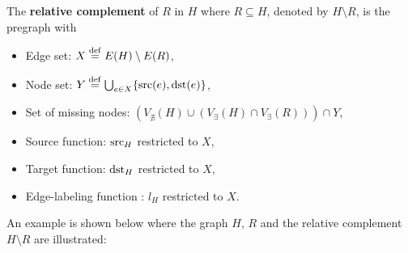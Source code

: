 The \textbf{relative complement} of $R$ in $H$ where $R \subseteq H$, denoted by $H \setminus R$, is the pregraph with
\begin{itemize}
    \item Edge set: $X \overset{\operatorname{def}}{=} E(H) \setminus E(R)$,
    \item Node set: $Y \overset{\operatorname{def}}{=} \bigcup_{e \in X} \{\operatorname{src}(e), \operatorname{dst}(e)\}$,
    \item Set of missing nodes: $
   ( V_{\nexists}(H)  \cup
        (
                  V_\exists(H) 
                  \cap 
                  V_\exists(R)
                  )
   )
        \cap  
        Y
                  $,
    \item Source function: ${\operatorname{src}_H}$ restricted to $X$,
    \item Target function: ${\operatorname{dst}_H}$ restricted to $X$,
    \item Edge-labeling function : $l_H$ restricted to $X$.
\end{itemize}
An example is shown below where the graph $H$, $R$ and the relative complement $H \setminus R$ are illustrated:
